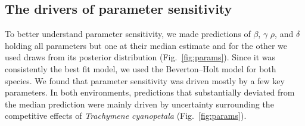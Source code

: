 \begin{refsection}
\begin{table}[H]
\caption[Combined LOOIC, weights and proportion of coexistence for different model combinations in the \textit{woody} environment]{Combined LOOIC, weights and proportion of coexistence for different model combinations in the \textit{woody} environment. Combined LOOIC and weights were calculated as the sum and product of both model's LOOIC and weights, respectively. Proportion of coexistence quantifies the proportion of coexistence predictions relative to competitive exclusion predictions for each model combination.}
\label{tab:proportions_woody}
\end{table}



\subsection*{ The drivers of parameter sensitivity }

To better understand parameter sensitivity, we made predictions of $\beta$, $\gamma$ $\rho$, and $\delta$ holding all parameters but one at their median
estimate and for the other we used draws from its posterior distribution (Fig.~\ref{fig:params}). Since it was consistently the best fit model, we used the Beverton--Holt model for both species. We found that parameter sensitivity was driven mostly by a few key parameters. In both environments, predictions that substantially deviated from the median prediction were mainly driven by uncertainty surrounding the competitive effects of \textit{Trachymene cyanopetala} (Fig.~\ref{fig:params}).



\end{refsection}

